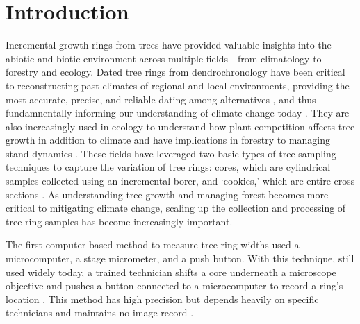 \documentclass[a4paper,12pt]{article}
\begin{document}
\section{Introduction} %
Incremental growth rings from trees have provided valuable insights into the abiotic and biotic environment across multiple fields---from climatology to forestry and ecology. Dated tree rings from dendrochronology have been critical to
reconstructing past climates of regional and local environments, providing the most accurate, precise, and reliable dating among alternatives \citep{mann_northern_1999}, and thus fundamnentally informing  our understanding of climate change today \citep{fritts_dendroclimatology_1971,williams_using_2010,guibal_dendrochronology_2021,sheppard_dendroclimatology_2010}. They are also increasingly used in ecology to understand how plant competition affects tree growth in addition to climate \citep{buechling_climate_2017} and have implications in forestry to managing stand dynamics \citep{canham_neighborhood_2004}. These fields have leveraged two basic types of tree sampling techniques to capture the variation of tree rings: cores, which are cylindrical samples collected using an incremental borer, and `cookies,' which are entire cross sections \citep[and thus allow measuring as many radii from the sample as desired,][]{speer_fundamentals_2010}. As understanding tree growth and managing forest becomes more critical to mitigating climate change, scaling up the collection and processing of tree ring samples has become increasingly important. 

The first computer-based method to measure tree ring widths used a microcomputer, a stage micrometer, and a push button. With this technique, still used widely today, a trained technician shifts a core underneath a microscope objective and pushes a button connected to a microcomputer to record a ring's location \citep{robinson_microcomputer_1980}. %
This method has high precision but depends heavily on specific technicians and maintains no image record \citep{levanic_atrics_2007}. 
\end{document}
